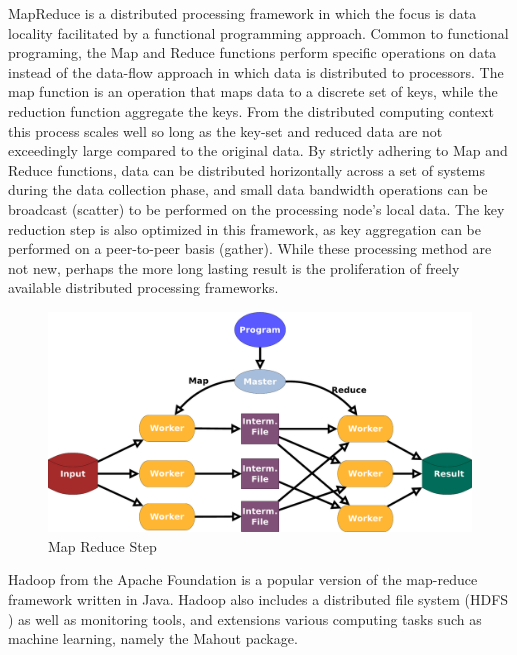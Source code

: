 MapReduce is a distributed processing framework in which the focus is data locality facilitated by a functional
programming approach.  Common to functional programing, the Map and Reduce functions perform specific operations on data
instead of the data-flow approach in which data is distributed to processors.  The map function is an operation that
maps data to a discrete set of keys, while the reduction function aggregate the keys.  From the distributed computing
context this process scales well so long as the key-set and reduced data are not exceedingly large compared to the
original data.  By strictly adhering to Map and Reduce functions, data can be distributed horizontally across a set of
systems during the data collection phase, and small data bandwidth operations can be broadcast (scatter) to be performed
on the processing node's local data.  The key reduction step is also optimized in this framework, as key aggregation can
be performed on a peer-to-peer basis (gather).  While these processing method are not new, perhaps the more long lasting
result is the proliferation of freely available distributed processing frameworks.

\begin{figure}
    \centerline{\includegraphics[width=.8\textwidth]{figs/mapreduce}}
    \caption{Map Reduce Step}\label{mr}
\end{figure}

Hadoop from the Apache Foundation is a popular version of the map-reduce framework written in Java.  Hadoop also includes a 
distributed file system (HDFS \cite{shvachko-10}) as well as monitoring tools, and extensions various computing tasks such as machine learning,
namely the Mahout package.

